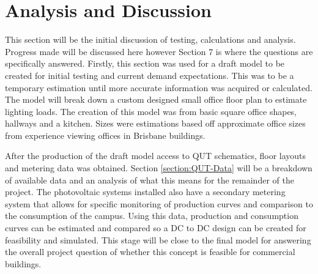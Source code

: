 
\section{Analysis and Discussion}

This section will be the initial discussion of testing, calculations and analysis. Progress made will be discussed here however Section 7 is where the questions are specifically answered. Firstly, this section was used for a draft model to be created for initial testing and current demand expectations. This was to be a temporary estimation until more accurate information was acquired or calculated. The model will break down a custom designed small office floor plan to estimate lighting loads. The creation of this model was from basic square office shapes, hallways and a kitchen. Sizes were estimations based off approximate office sizes from experience viewing offices in Brisbane buildings.  
\newline

After the production of the draft model access to QUT schematics, floor layouts and metering data was obtained. Section \ref{section:QUT-Data} will be a breakdown of available data and an analysis of what this means for the remainder of the project. The photovoltaic systems installed also have a secondary metering system that allows for specific monitoring of production curves and comparison to the consumption of the campus. Using this data, production and consumption curves can be estimated and compared so a DC to DC design can be created for feasibility and simulated. This stage will be close to the final model for answering the overall project question of whether this concept is feasible for commercial buildings.    